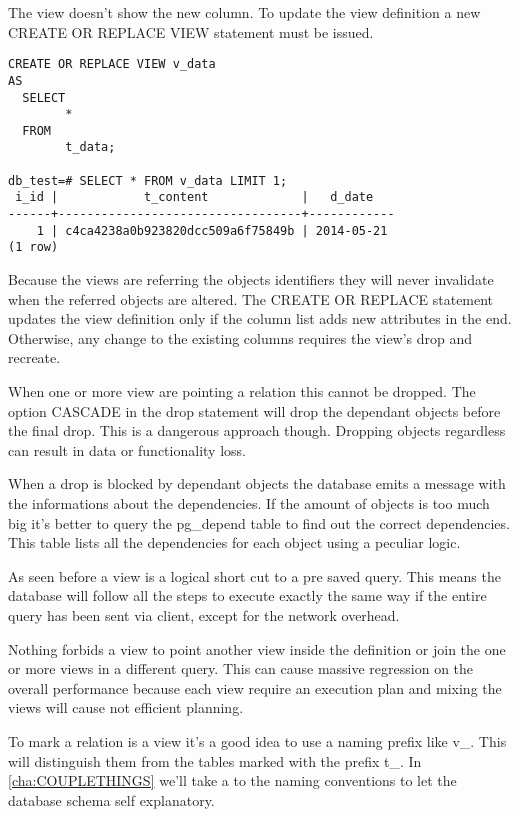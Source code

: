 The view doesn't show the new column. To update the view definition a new 
CREATE OR REPLACE VIEW statement must be issued.

\begin{lstlisting}[style=pgsql]
 CREATE OR REPLACE VIEW v_data 
AS 
  SELECT 
        *
  FROM 
        t_data;
        
db_test=# SELECT * FROM v_data LIMIT 1;
 i_id |            t_content             |   d_date   
------+----------------------------------+------------
    1 | c4ca4238a0b923820dcc509a6f75849b | 2014-05-21
(1 row)

\end{lstlisting}

Because the views are referring the objects identifiers they will never 
invalidate when the referred objects are altered. 
The CREATE OR REPLACE statement updates the view definition only if the column 
list adds new attributes in the end. 
Otherwise, any change to the existing columns requires the view's drop and 
recreate. 

When one or more view are pointing a relation this cannot be dropped. 
The option CASCADE in the drop statement will drop the dependant objects before 
the final drop. This is a dangerous approach though. Dropping objects 
regardless can result in data or functionality loss.

When a drop is blocked by dependant objects the database emits a message with 
the informations about the dependencies. If the amount of objects is too much 
big it's better to query the pg\_depend table to find out the correct 
dependencies. This table lists all the dependencies for each object using a 
peculiar logic.


As seen before a view is a logical short cut to a pre saved query. This means 
the database will follow all the steps to execute exactly the same way if the 
entire query has been sent via client, except for the network overhead.

Nothing forbids a view to point another view inside the definition or join 
the one or more views in a different query. This can cause massive 
regression on the overall performance because each view require an execution 
plan and mixing the views will cause not efficient planning. 

To mark a relation is a view it's a good idea to use a naming prefix like v\_. 
This will distinguish them from the tables marked with the prefix t\_.
In \ref{cha:COUPLETHINGS} we'll take a to the naming conventions to let the 
database schema self explanatory.

